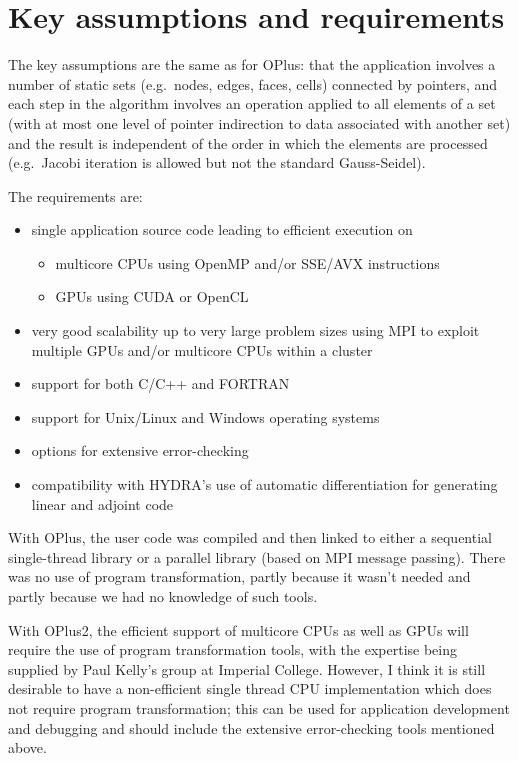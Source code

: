 \documentclass[12pt]{article}
\begin{document}
\newpage

\section{Key assumptions and requirements}

The key assumptions are the same as for OPlus: that the 
application involves a number of static sets (e.g.~nodes, edges, 
faces, cells) connected by pointers, and each step in the algorithm 
involves an operation applied to all elements of a set (with at
most one level of pointer indirection to data associated with another
set) and the result is independent of the order in which the elements 
are processed (e.g.~Jacobi iteration is allowed but not the standard 
Gauss-Seidel).

The requirements are:
\begin{itemize}
\item
single application source code leading to efficient execution on 
\begin{itemize}
\item
multicore CPUs using OpenMP and/or SSE/AVX instructions
\item
GPUs using CUDA or OpenCL
\end{itemize}

\item
very good scalability up to very large problem sizes using MPI 
to exploit multiple GPUs and/or multicore CPUs within a cluster

\item 
support for both C/C++ and FORTRAN

\item
support for Unix/Linux and Windows operating systems

\item
options for extensive error-checking

\item
compatibility with HYDRA's use of automatic differentiation 
for generating linear and adjoint code

\end{itemize}

With OPlus, the user code was compiled and then linked to either a 
sequential single-thread library or a parallel library (based on MPI
message passing).  There was no use of program transformation, partly 
because it wasn't needed and partly because we had no knowledge of 
such tools.

With OPlus2, the efficient support of multicore CPUs as well as GPUs 
will require the use of program transformation tools, with the expertise 
being supplied by Paul Kelly's group at Imperial College.
However, I think it is still desirable to have a non-efficient single 
thread CPU implementation which does not require program transformation; 
this can be used for application development and debugging and should 
include the extensive error-checking tools mentioned above.
\end{document}
